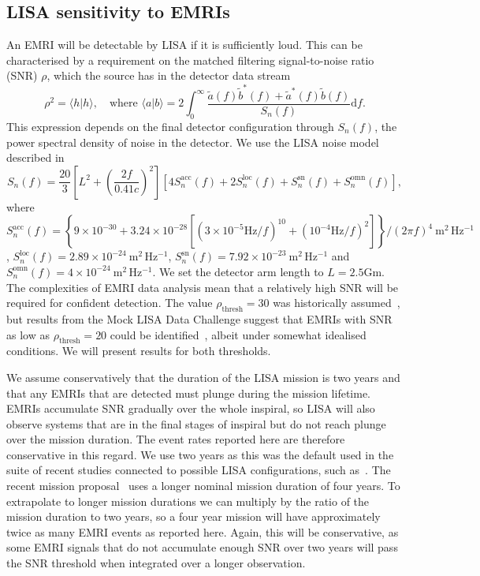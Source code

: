 \documentclass[a4paper]{jpconf}
\begin{document}
\subsection{LISA sensitivity to EMRIs}
An EMRI will be detectable by LISA if it is sufficiently loud. This can be characterised by a requirement on the matched filtering signal-to-noise ratio (SNR) $\rho$, which the source has in the detector data stream
\begin{equation}
\rho^2 = \langle h | h \rangle, \quad \mbox{where } \langle a|b \rangle = 2 \int_0^\infty \frac{\tilde{a}(f) \tilde{b}^*(f)+\tilde{a}^*(f) \tilde{b}(f)}{S_n(f)} \mathrm{d}f.
\end{equation}
This expression depends on the final detector configuration through $S_n(f)$, the power spectral density of noise in the detector. We use the LISA noise model described in~\cite{L3missprop}
\begin{equation}
S_n(f) = \frac{20}{3} \left[ L^2 + \left(\frac{2f}{0.41c} \right)^2\right] \left[ 4 S_n^\mathrm{acc}(f) + 2 S_n^\mathrm{loc}(f) +S_n^\mathrm{sn}(f) +S_n^\mathrm{omn}(f)\right],
\end{equation}
where $S_n^\mathrm{acc}(f)=\left\{9\times10^{-30}+3.24 \times 10^{-28}\left[ (3\times10^{-5} \mathrm{Hz}/f)^{10} + (10^{-4} \mathrm{Hz}/f)^2\right]\right\}/(2\pi f)^4~\mathrm{m^2\,Hz^{-1}}$, $S_n^\mathrm{loc}(f)=2.89\times10^{-24}~\mathrm{m^2\,Hz^{-1}}$, $S_n^\mathrm{sn}(f)=7.92\times10^{-23}~\mathrm{m^2\,Hz^{-1}}$ and $S_n^\mathrm{omn}(f)=4\times10^{-24}~\mathrm{m^2\,Hz^{-1}}$. We set the detector arm length to $L=2.5$Gm. The complexities of EMRI data analysis mean that a relatively high SNR will be required for confident detection. The value $\rho_\mathrm{ thresh} = 30$ was historically assumed~\cite{EMRIrate04}, but results from the Mock LISA Data Challenge suggest that EMRIs with SNR as low as $\rho_\mathrm{thresh} = 20$ could be identified~\cite{MLDC3}, albeit under somewhat idealised conditions. We will present results for both thresholds.

We assume conservatively that the duration of the LISA mission is two years and that any EMRIs that are detected must plunge during the mission lifetime. EMRIs accumulate SNR gradually over the whole inspiral, so LISA will also observe systems that are in the final stages of inspiral but do not reach plunge over the mission duration. The event rates reported here are therefore conservative in this regard. We use two years as this was the default used in the suite of recent studies connected to possible LISA configurations, such as~\cite{GOATMBH}. The recent mission proposal~\cite{L3missprop} uses a longer nominal mission duration of four years. To extrapolate to longer mission durations we can multiply by the ratio of the mission duration to two years, so a four year mission will have approximately twice as many EMRI events as reported here. Again, this will be conservative, as some EMRI signals that do not accumulate enough SNR over two years will pass the SNR threshold when integrated over a longer observation.
\end{document}
